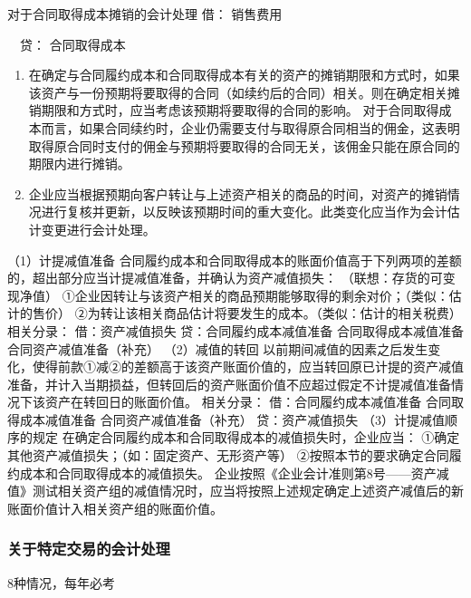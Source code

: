 \documentclass[UTF8,12pt]{ctexart}
\newenvironment{Dr}{\noindent 借：}{\par}
\newenvironment{Cr}{\noindent \ \ 贷：}{\par}
\numberwithin{equation}{section} %
\numberwithin{figure}{section}
\numberwithin{table}{section}
\begin{document}
	对于合同取得成本摊销的会计处理
	\begin{Dr}
		销售费用
	\end{Dr}
	\begin{Cr}
		合同取得成本
	\end{Cr}

	\begin{enumerate}
		\item 在确定与合同履约成本和合同取得成本有关的资产的摊销期限和方式时，如果该资产与一份预期将要取得的合同（如续约后的合同）相关。则在确定相关摊销期限和方式时，应当考虑该预期将要取得的合同的影响。
		对于合同取得成本而言，如果合同续约时，企业仍需要支付与取得原合同相当的佣金，这表明取得原合同时支付的佣金与预期将要取得的合同无关，该佣金只能在原合同的期限内进行摊销。
		
		\item 企业应当根据预期向客户转让与上述资产相关的商品的时间，对资产的摊销情况进行复核并更新，以反映该预期时间的重大变化。此类变化应当作为会计估计变更进行会计处理。
	\end{enumerate}
	
	（1）计提减值准备
	合同履约成本和合同取得成本的账面价值高于下列两项的差额的，超出部分应当计提减值准备，并确认为资产减值损失：
	（联想：存货的可变现净值）
	①企业因转让与该资产相关的商品预期能够取得的剩余对价；（类似：估计的售价）
	②为转让该相关商品估计将要发生的成本。（类似：估计的相关税费）
	相关分录：
	借：资产减值损失
	贷：合同履约成本减值准备
	合同取得成本减值准备
	合同资产减值准备（补充） 
	（2）减值的转回
	以前期间减值的因素之后发生变化，使得前款①减②的差额高于该资产账面价值的，应当转回原已计提的资产减值准备，并计入当期损益，但转回后的资产账面价值不应超过假定不计提减值准备情况下该资产在转回日的账面价值。
	相关分录：
	借：合同履约成本减值准备
	合同取得成本减值准备
	合同资产减值准备（补充）
	贷：资产减值损失 
	（3）计提减值顺序的规定
	在确定合同履约成本和合同取得成本的减值损失时，企业应当：
	①确定其他资产减值损失；（如：固定资产、无形资产等）
	②按照本节的要求确定合同履约成本和合同取得成本的减值损失。
	企业按照《企业会计准则第8号——资产减值》测试相关资产组的减值情况时，应当将按照上述规定确定上述资产减值后的新账面价值计入相关资产组的账面价值。
	
	
	\subsubsection{关于特定交易的会计处理}
	8种情况，每年必考
\end{document}
